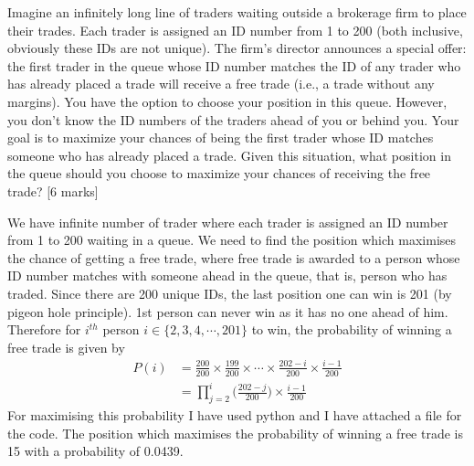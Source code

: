 \begin{que}
	Imagine an infinitely long line of traders waiting outside a brokerage firm to
	place their trades. Each trader is assigned an ID number from 1 to 200 (both
	inclusive, obviously these IDs are not unique). The firm’s director announces
	a special offer: the first trader in the queue whose ID number matches the ID
	of any trader who has already placed a trade will receive a free trade (i.e.,
	a trade without any margins). You have the option to choose your position in
	this queue.   However, you don’t know the ID numbers of the traders ahead of
	you or behind you. Your goal is to maximize your chances of being the first
	trader whose ID matches someone who has already placed a trade. Given this
	situation, what position in the queue should you choose to maximize your
	chances of receiving the free trade?
	\hspace*{\fill} [6 marks]
\end{que}
\begin{tcolorbox}[breakable]
	\begin{sol}
		We have infinite number of trader where each trader is assigned an ID number from 1 to 200 waiting in a queue. We need to find the position which maximises the chance of getting a free trade, where free trade is awarded to a person whose ID number matches with someone ahead in the queue, that is, person who has traded. Since there are 200 unique IDs, the last position one can win is 201 (by pigeon hole principle). 1st person can never win as it has no one ahead of him. Therefore for $i^{th}$ person $i \in \{2,3,4,\cdots,201 \}$ to win, the probability of winning a free trade is given by
		\begin{align}
			P(i) & = \frac{200}{200} \times \frac{199}{200} \times \cdots \times \frac{202 - i}{200} \times \frac{i-1}{200} \\
			     & = \prod_{j=2}^{i} \Bigg( \frac{202 - j}{200} \Bigg) \times \frac{i - 1}{200}
		\end{align}
		For maximising this probability I have used python and I have attached a file for the code. The position which maximises the probability of winning a free trade is 15 with a probability of 0.0439.

	\end{sol}
\end{tcolorbox}
